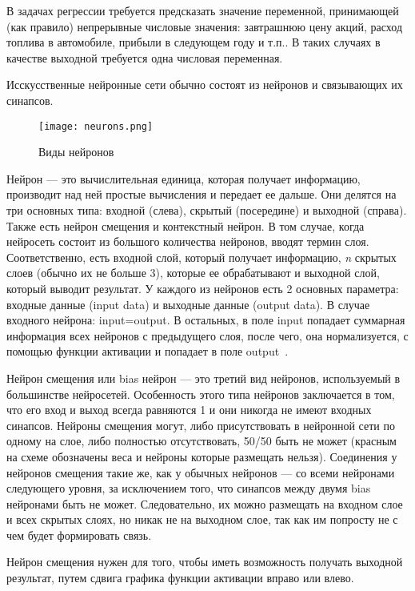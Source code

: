 В задачах регрессии требуется предсказать значение переменной, принимающей (как правило) непрерывные числовые
значения: завтрашнюю цену акций, расход топлива в автомобиле, прибыли в следующем году и т.п.. В таких случаях в
качестве выходной требуется одна числовая переменная.

Исскусственные нейронные сети обычно состоят из нейронов и связывающих их синапсов.

\begin{figure}[!ht]
  \centering
  \texttt{[image: neurons.png]} 
  \caption{Виды нейронов}
  \label{fig:analysis:neurons}
\end{figure}

Нейрон — это вычислительная единица, которая получает информацию, производит над ней простые вычисления и передает ее
дальше. Они делятся на три основных типа: входной (слева), скрытый (посередине) и выходной (справа). Также есть нейрон
смещения и контекстный нейрон. В том случае, когда нейросеть состоит из большого количества нейронов, вводят термин
слоя. Соответственно, есть входной слой, который получает информацию, \emph{n} скрытых слоев (обычно их не больше 3),
которые ее обрабатывают и выходной слой, который выводит результат. У каждого из нейронов есть 2 основных параметра:
входные данные (input data) и выходные данные (output data). В случае входного нейрона: input=output. В остальных,
в поле input попадает суммарная информация всех нейронов с предыдущего слоя, после чего, она нормализуется, с помощью
функции активации и попадает в поле output~\cite{neural-networks}.

Нейрон смещения или bias нейрон — это третий вид нейронов, используемый в большинстве нейросетей. Особенность этого
типа нейронов заключается в том, что его вход и выход всегда равняются 1 и они никогда не имеют входных синапсов.
Нейроны смещения могут, либо присутствовать в нейронной сети по одному на слое, либо полностью отсутствовать,
50/50 быть не может (красным на схеме обозначены веса и нейроны которые размещать нельзя). Соединения у нейронов
смещения такие же, как у обычных нейронов — со всеми нейронами следующего уровня, за исключением того, что синапсов
между двумя bias нейронами быть не может. Следовательно, их можно размещать на входном слое и всех скрытых слоях,
но никак не на выходном слое, так как им попросту не с чем будет формировать связь.

Нейрон смещения нужен для того, чтобы иметь возможность получать выходной результат, путем сдвига графика функции
активации вправо или влево.

